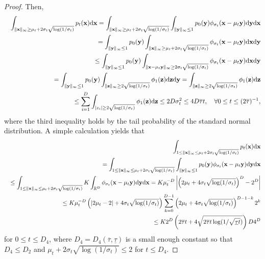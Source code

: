 \documentclass[twoside,11pt]{article}
\newcommand{\bx}{{\bf x}}
\newcommand{\by}{{\bf y}}
\newcommand{\bz}{{\bf z}}
\newcommand{\bbR}{{\mathbb R}}
\newcommand{\bean}{\setlength\arraycolsep{1pt}\begin{eqnarray*}}
\newcommand{\eean}{\end{eqnarray*}}
\def\d{{\rm d}}
\begin{document}
\begin{proof}
Then, 
\bean
&& \int_{\| \bx \|_{\infty} \geq \mu_t +  2 \sigma_{t} \sqrt{\log(1/\sigma_t)}} p_t(\bx) \d \bx = 
\int_{\| \bx \|_{\infty} \geq \mu_t +  2 \sigma_{t} \sqrt{\log(1/\sigma_t)}} \int_{\| \by \|_{\infty} \leq 1} p_0(\by) \phi_{\sigma_t}(\bx-\mu_t \by) \d \by \d \bx
\\
&&= \int_{\| \by \|_{\infty} \leq 1} p_0(\by) \int_{\| \bx \|_{\infty} \geq \mu_t +  2 \sigma_{t} \sqrt{\log(1/\sigma_t)}} \phi_{\sigma_t}(\bx-\mu_t \by)  \d \bx \d \by
\\
&& \leq \int_{\| \by \|_{\infty} \leq 1} p_0(\by) \int_{ \| \bx - \mu_t \by \|_{\infty} \geq  2 \sigma_{t} \sqrt{\log(1/\sigma_t)}} \phi_{\sigma_t}(\bx-\mu_t \by)  \d \bx \d \by
\\
&& = \int_{\| \by \|_{\infty} \leq 1} p_0(\by) \int_{ \| \bz \|_{\infty} \geq  2 \sqrt{\log(1/\sigma_t)}} \phi_{1}(\bz)  \d \bz \d \by
=  \int_{ \| \bz \|_{\infty} \geq  2 \sqrt{\log(1/\sigma_t)}} \phi_{1}(\bz)  \d \bz
\\
&& \leq  \sum_{i=1}^{D} \int_{\vert z_i \vert \geq 2 \sqrt{\log(1/\sigma_t)}} \phi_{1}(\bz) \d \bz
\leq 2 D  \sigma_t^{2} \leq 4 D  \overline{\tau} t 
,\quad \forall 0 \leq t \leq (2\overline{\tau})^{-1},
\eean
where the third inequality holds by the tail probability of the standard normal distribution.
A simple calculation yields that
\bean
&& \int_{1 \leq \| \bx \|_{\infty} \leq \mu_t + 2\sigma_t \sqrt{\log(1/\sigma_t)} } p_t(\bx) \d \bx 
\\
&& = \int_{1 \leq \| \bx \|_{\infty} \leq \mu_t + 2\sigma_t \sqrt{\log(1/\sigma_t)} } \int_{\|\by\|_{\infty} \leq 1} p_0(\by) \phi_{\sigma_t}(\bx-\mu_t\by) \d \by \d \bx 
\\
&& \leq \int_{1 \leq \| \bx \|_{\infty} \leq \mu_t + 2\sigma_t \sqrt{\log(1/\sigma_t)} } K \int_{\bbR^{D}} \phi_{\sigma_t}(\bx - \mu_t \by ) \d \by  \d \bx
= K \mu_{t}^{-D} \left\vert  \left( 2 \mu_t + 4\sigma_t \sqrt{\log(1/\sigma_t)} \right)^{D} - 2^{D}  \right\vert
\\
&& 
\leq K \mu_{t}^{-D} \left(\vert 2\mu_{t} - 2 \vert +  4 \sigma_{t} \sqrt{\log(1/\sigma_{t})} \right) \sum_{k=0}^{D-1} \left(2 \mu_{t} + 4 \sigma_{t} \sqrt{\log(1/\sigma_{t})} \right)^{{D-1-k}} 2^{k}
\\
&& \leq K 2^{D} \left( 2 \overline{\tau} t + 4 \sqrt{2 \overline{\tau} t \log (1/\sqrt{\underline{\tau}t}) } \right) D 4^{D}
\eean
for $0 \leq t \leq D_{4}$, where $D_{4} = D_{4}(\overline{\tau}, \underline{\tau})$ is a small enough constant so that $D_{4} \leq D_{2}$ and $\mu_{t} + 2 \sigma_{t} \sqrt{\log(1/\sigma_{t})} \leq 2$ for $t \leq D_{4}$.

\end{proof}
\end{document}
